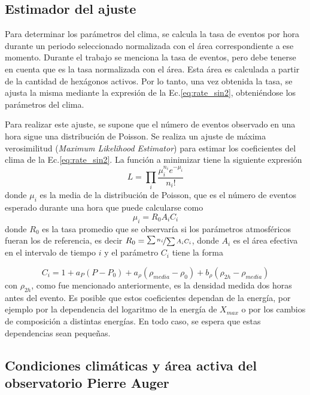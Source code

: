 \subsection{Estimador del ajuste}

Para determinar los parámetros del clima, se calcula la tasa de eventos por hora durante un periodo seleccionado normalizada con el área correspondiente a ese momento. Durante el trabajo se menciona la tasa de eventos, pero debe tenerse en cuenta que es la tasa normalizada con el área. Esta área es calculada a partir de la cantidad de hexágonos activos. Por lo tanto, una vez obtenida la tasa, se ajusta la misma mediante la expresión de la Ec.\ref{eq:rate_sin2}, obteniéndose los parámetros del clima.

Para realizar este ajuste, se supone que el número de eventos observado en una hora sigue una distribución de Poisson. Se realiza un ajuste de máxima verosimilitud (\emph{Maximum Likelihood Estimator}) para estimar los coeficientes del clima de la Ec.\ref{eq:rate_sin2}. La función a minimizar tiene la siguiente expresión 
\begin{equation}
	L=\prod_i\frac{\mu_i^{n_i} e^{-\mu_i}}{n_i!}
\end{equation}
donde $\mu_i$ es la media de la distribución de Poisson, que es el número de eventos esperado durante una hora que puede calcularse como
\begin{equation}
	\mu_i = R_0A_iC_i
\end{equation}
donde $R_0$ es la tasa promedio que se observaría si los parámetros atmosféricos fueran los de referencia, es decir $R_0=\nicefrac{\sum n_i}{\sum A_iC_i}$, donde $A_i$ es el área efectiva en el intervalo de tiempo $i$ y el parámetro $C_i$ tiene la forma

\begin{equation}
	C_i = 1+a_P(P-P_0) +a_{\rho}(\rho_{media}-\rho_0) + b_{\rho}(\rho_{2h}-\rho_{media}) 
\end{equation}
con $\rho_{2h}$, como fue mencionado anteriormente, es la densidad medida dos horas antes del evento. Es posible que estos coeficientes dependan de la energía, por ejemplo por la dependencia del logaritmo de la energía de $X_{max}$ o por los cambios de composición a distintas energías. En todo caso, se espera que estas dependencias sean pequeñas.

\subsection{Condiciones climáticas y área activa del observatorio Pierre Auger}

